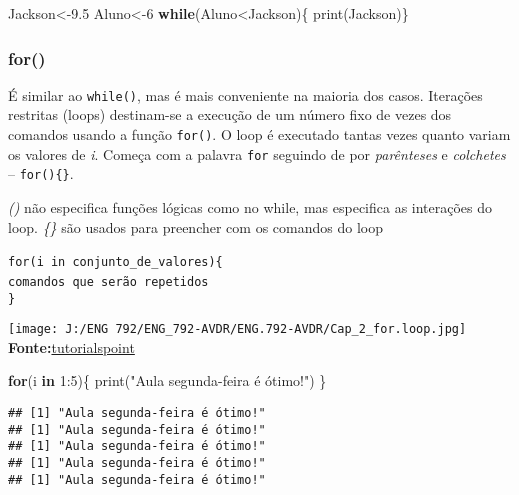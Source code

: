 \documentclass[
]{book}
\newenvironment{Shaded}{\begin{snugshade}}{\end{snugshade}}
\newcommand{\ControlFlowTok}[1]{\textcolor[rgb]{0.13,0.29,0.53}{\textbf{#1}}}
\newcommand{\DecValTok}[1]{\textcolor[rgb]{0.00,0.00,0.81}{#1}}
\newcommand{\FloatTok}[1]{\textcolor[rgb]{0.00,0.00,0.81}{#1}}
\newcommand{\FunctionTok}[1]{\textcolor[rgb]{0.00,0.00,0.00}{#1}}
\newcommand{\NormalTok}[1]{#1}
\newcommand{\OtherTok}[1]{\textcolor[rgb]{0.56,0.35,0.01}{#1}}
\newcommand{\SpecialCharTok}[1]{\textcolor[rgb]{0.00,0.00,0.00}{#1}}
\newcommand{\StringTok}[1]{\textcolor[rgb]{0.31,0.60,0.02}{#1}}
\begin{document}
\begin{Shaded}
\begin{Highlighting}[]
\NormalTok{Jackson}\OtherTok{\textless{}{-}}\FloatTok{9.5}  
\NormalTok{Aluno}\OtherTok{\textless{}{-}}\DecValTok{6}  
\ControlFlowTok{while}\NormalTok{(Aluno}\SpecialCharTok{\textless{}}\NormalTok{Jackson)\{  }
  \FunctionTok{print}\NormalTok{(Jackson)\} }
\end{Highlighting}
\end{Shaded}

\hypertarget{for}{%
\subsubsection{for()}\label{for}}

É similar ao \texttt{while()}, mas é mais conveniente na maioria dos casos.
Iterações restritas (loops) destinam-se a execução de um número fixo de vezes dos comandos usando a função \texttt{for()}.
O loop é executado tantas vezes quanto variam os valores de \emph{i}.
Começa com a palavra \texttt{for} seguindo de por \emph{parênteses} e \emph{colchetes} -- \texttt{for()\{\}}.

\emph{()} não especifica funções lógicas como no while, mas especifica as interações do loop.
\emph{\{\}} são usados para preencher com os comandos do loop

\texttt{for(i\ in\ conjunto\_de\_valores)\{}~\\
\texttt{comandos\ que\ serão\ repetidos}~\\
\texttt{\}}

\texttt{[image: J:/ENG 792/ENG\_792-AVDR/ENG.792-AVDR/Cap\_2\_for.loop.jpg]}\\
\textbf{Fonte:}\href{https://www.tutorialspoint.com/r/r_for_loop.htm}{tutorialspoint}

\begin{Shaded}
\begin{Highlighting}[]
\ControlFlowTok{for}\NormalTok{(i  }\ControlFlowTok{in} \DecValTok{1}\SpecialCharTok{:}\DecValTok{5}\NormalTok{)\{}
  \FunctionTok{print}\NormalTok{(}\StringTok{"Aula segunda{-}feira é ótimo!"}\NormalTok{)}
\NormalTok{\}}
\end{Highlighting}
\end{Shaded}

\begin{verbatim}
## [1] "Aula segunda-feira é ótimo!"
## [1] "Aula segunda-feira é ótimo!"
## [1] "Aula segunda-feira é ótimo!"
## [1] "Aula segunda-feira é ótimo!"
## [1] "Aula segunda-feira é ótimo!"
\end{verbatim}
\end{document}
